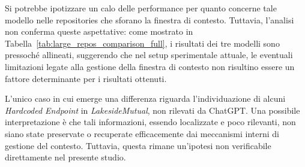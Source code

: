 Si potrebbe ipotizzare un calo delle performance per quanto concerne tale modello nelle repositories che sforano la finestra di contesto. Tuttavia, l'analisi non conferma queste aspettative: come mostrato in Tabella~\ref{tab:large_repos_comparison_full}, i risultati dei tre modelli sono pressoché allineati, suggerendo che nel setup sperimentale attuale, le eventuali limitazioni legate alla gestione della finestra di contesto non risultino essere un fattore determinante per i risultati ottenuti. 

L’unico caso in cui emerge una differenza riguarda l’individuazione di alcuni \textit{Hardcoded Endpoint} in \textit{LakesideMutual}, non rilevati da ChatGPT. Una possibile interpretazione è che tali informazioni, essendo localizzate e poco rilevanti, non siano state preservate o recuperate efficacemente dai meccanismi interni di gestione del contesto. Tuttavia, questa rimane un’ipotesi non verificabile direttamente nel presente studio.



